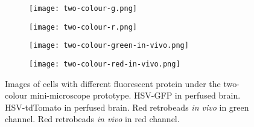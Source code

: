 \begin{figure}[h]
    \begin{subfigure}[t]{.5\linewidth}
        \texttt{[image: two-colour-g.png]}
        \caption{\label{f.twocolour.g}}
    \end{subfigure}
    \begin{subfigure}[t]{.5\linewidth}
        \texttt{[image: two-colour-r.png]}
        \caption{\label{f.twocolour.r}}
    \end{subfigure}
    \begin{subfigure}[t]{.5\linewidth}
        \texttt{[image: two-colour-green-in-vivo.png]}
        \caption{\label{f.twocolour.g.invivo}}
    \end{subfigure}
    \begin{subfigure}[t]{.5\linewidth}
        \texttt{[image: two-colour-red-in-vivo.png]}
        \caption{\label{f.twocolour.r.invivo}}
    \end{subfigure}

    \caption{Images of cells with different fluorescent protein under the two-colour mini-microscope prototype.  HSV-GFP in perfused brain.  HSV-tdTomato in perfused brain.  Red retrobeads \textit{in vivo} in green channel.  Red retrobeads \textit{in vivo} in red channel. \label{f.twocolour}}
\end{figure}

















\begin{comment}
\begin{figure}[h]
    \texttt{[image: behaviour-schematic.png]}
    \caption{Proposed experiment. A mixture of GCaMP6s-expressing AAV and tdTomato-expressing long-term HSV are infused into LA of the animals. A two-colour microscope is implanted to visualize infected LA neurons. The animal then subject to auditory fear conditioning paradigm, and GCaMP6s signals in either tdTomato\textsuperscript{+} or tdTomato\textsuperscript{-} cells are recorded. We hypothesize that the tdTomato\textsuperscript{+} cells will be more excitable than tdTomato\textsuperscript{-} cells during training and testing. \label{f.behaviour-schema}}
\end{figure}
\end{comment}




